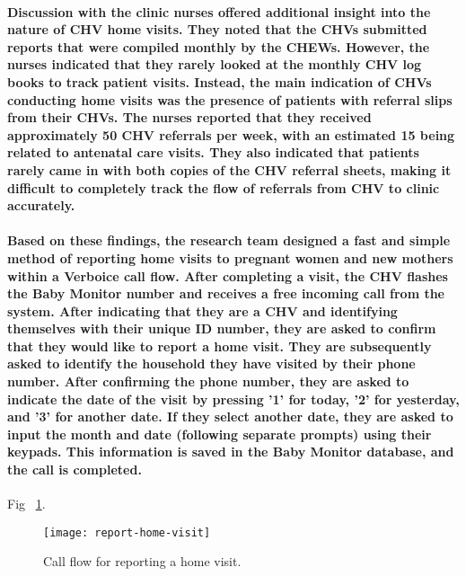 \paragraph{Discussion with the clinic nurses offered additional insight into the nature of CHV home visits. They noted that the CHVs submitted reports that were compiled monthly by the CHEWs. However, the nurses indicated that they rarely looked at the monthly CHV log books to track patient visits. Instead, the main indication of CHVs conducting home visits was the presence of patients with referral slips from their CHVs. The nurses reported that they received approximately 50 CHV referrals per week, with an estimated 15 being related to antenatal care visits. They also indicated that patients rarely came in with both copies of the CHV referral sheets, making it difficult to completely track the flow of referrals from CHV to clinic accurately.}

\paragraph{Based on these findings, the research team designed a fast and simple method of reporting home visits to pregnant women and new mothers within a Verboice call flow. After completing a visit, the CHV flashes the Baby Monitor number and receives a free incoming call from the system. After indicating that they are a CHV and identifying themselves with their unique ID number, they are asked to confirm that they would like to report a home visit. They are subsequently asked to identify the household they have visited by  their phone number. After confirming the phone number, they are asked to indicate the date of the visit by pressing '1' for today, '2' for yesterday, and '3' for another date. If they select another date, they are asked to input the month and date (following separate prompts) using their keypads. This information is saved in the Baby Monitor database, and the call is completed.}

Fig ~\ref{fig:homevisit}.
\begin{figure}[]
	\begin{center}
	\texttt{[image: report-home-visit]}
	\end{center}
	\caption{Call flow for reporting a home visit.}
	\label{fig:homevisit}
\end{figure}

